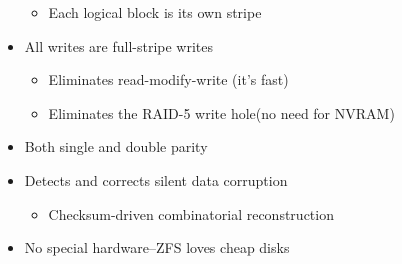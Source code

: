 \begin{frame}[fragile]
\begin{columns}
\begin{column}{0.6\textwidth}
\begin{itemize}
\begin{itemize}
                \item Each logical block is its own stripe
            \end{itemize} \pause
            \item All writes are full-stripe writes
            \begin{itemize}
                \item Eliminates read-modify-write (it's fast)
                \item Eliminates the RAID-5 write hole(no need for NVRAM)
            \end{itemize} \pause
            \item Both single and double parity
            \item Detects and corrects silent data corruption
            \begin{itemize}
                \item Checksum-driven combinatorial reconstruction
            \end{itemize} \pause
            \item {\color{red}No special hardware}–ZFS loves cheap disks
        \end{itemize}
      \end{column}
      \end{columns}
\end{frame}
% 
% 
% 
% 
